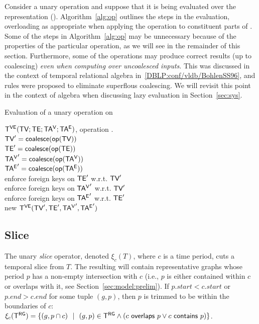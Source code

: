 Consider a unary operation \op and suppose that it is being evaluated
over the \ve representation \op(\tve).  Algorithm~\ref{alg:op}
outlines the steps in the evaluation, overloading \opp as appropriate
when applying the operation to constituent parts of \tve.  Some of the
steps in Algorithm~\ref{alg:op} may be unnecessary because of the
properties of the particular operation, as we will see in the
remainder of this section.  Furthermore, some of the operations may
produce correct results (up to coalescing) {\em even when computing
  over uncoalesced inputs}.  This was discussed in the context of
temporal relational algebra in~\ref{DBLP:conf/vldb/BohlenSS96}, and
rules were proposed to eliminate superflous coalescing. We will
revisit this point in the context of \tg algebra when discussing lazy
evaluation in Section~\ref{sec:sys}.

\begin{algorithm}[h!]
\caption{Evaluation of a unary operation on \tve}
\begin{algorithmic}[1]
\REQUIRE \tg $\mathsf{T^{VE}} (\textsf{TV}; \textsf{TE}; \mathsf{TA^{V}}; \mathsf{TA^{E}})$, operation .\\
\STATE  $\textsf{TV}' = \textsf{coalesce} (\textsf{op}(\textsf{TV}))$\\
\STATE  $\textsf{TE}' = \textsf{coalesce} (\textsf{op}(\textsf{TE}))$\\
\STATE  $\mathsf{TA^{V}}' = \textsf{coalesce} (\textsf{op}(\mathsf{TA^{V}}))$\\
\STATE  $\mathsf{TA^{E}}' = \textsf{coalesce} (\textsf{op}(\mathsf{TA^{E}}))$\\
\STATE  enforce foreign keys on $\textsf{TE}'$ w.r.t. $\textsf{TV}'$\\
\STATE  enforce foreign keys on $\mathsf{TA^{V}}'$ w.r.t. $\textsf{TV}'$\\
\STATE  enforce foreign keys on $\mathsf{TA^{E}}'$ w.r.t. $\textsf{TE}'$\\
\RETURN new $\mathsf{T^{VE}} (\textsf{TV}', \textsf{TE}', \mathsf{TA^{V}}', \mathsf{TA^{E}}')$\\
\end{algorithmic}
\label{alg:op}
\end{algorithm}

\subsection{Slice}
\label{sec:algebra:slice}

The unary {\em slice} operator, denoted $\xi_c (T)$, where $c$ is a
time period, cuts a temporal slice from $T$.  The resulting \tg will
contain representative graphs whose period $p$ has a non-empty
intersection with $c$ (i.e., $p$ is either contained within $c$ or
overlaps with it, see Section~\ref{sec:model:prelim}).  If $p.start <
c.start$ or $p.end > c.end$ for some tuple $(g, p)$, then $p$ is
trimmed to be within the boundaries of $c$: $\xi_c (\mathsf{T^{RG}}) = \{ (g, p
\cap c)~~|~~(g, p) \in \mathsf{T^{RG}} \wedge (c~\mathsf{overlaps}~p \vee
c~\mathsf{contains}~p)\}$.

